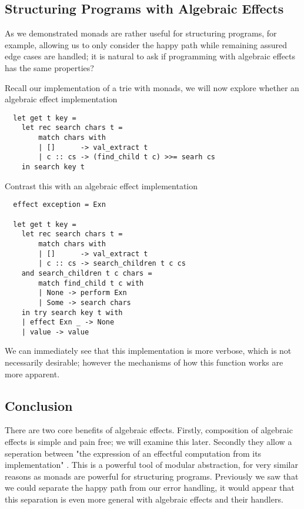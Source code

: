 \subsection{Structuring Programs with Algebraic Effects}
As we demonstrated monads are rather useful for structuring programs,
for example,
allowing us to only consider the happy path while remaining assured
edge cases are handled;
it is natural to ask if programming with algebraic effects
has the same properties?

Recall our implementation of a trie with monads,
we will now explore whether an algebraic effect implementation
\begin{verbatim}
  let get t key =
    let rec search chars t =
        match chars with
        | []      -> val_extract t
        | c :: cs -> (find_child t c) >>= searh cs
    in search key t
\end{verbatim}

Contrast this with an algebraic effect implementation

\begin{verbatim}
  effect exception = Exn

  let get t key =
    let rec search chars t =
        match chars with
        | []      -> val_extract t
        | c :: cs -> search_children t c cs
    and search_children t c chars =
        match find_child t c with
        | None -> perform Exn
        | Some -> search chars
    in try search key t with
    | effect Exn _ -> None
    | value -> value
\end{verbatim}

We can immediately see that this implementation is more verbose,
which is not necessarily desirable;
however the mechanisms of how this function works
are more apparent.

\subsection{Conclusion}
There are two core benefits of algebraic effects.
Firstly, composition of algebraic effects is simple and pain free;
we will examine this later.
Secondly they allow a seperation between
"the expression of an effectful computation from its implementation"
\cite{dolan2015effective}.
This is a powerful tool of modular abstraction,
for very similar reasons as monads are powerful
for structuring programs.
Previously we saw that we could separate the happy path from our error handling,
it would appear that this separation is even more general with algebraic effects
and their handlers.

